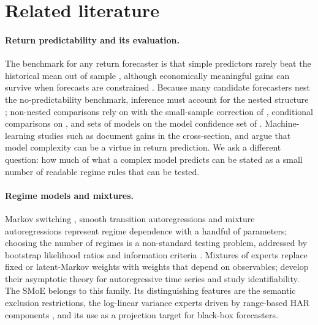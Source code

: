 \section{Related literature}\label{sec:literature}

\paragraph{Return predictability and its evaluation.}
The benchmark for any return forecaster is that simple predictors rarely beat the historical mean
out of sample \citep{welch2008comprehensive}, although economically meaningful gains can survive
when forecasts are constrained \citep{campbell2008predicting}. Because many candidate forecasters nest
the no-predictability benchmark, inference must account for the nested structure
\citep{clark2007approximately}; non-nested comparisons rely on \citet{diebold1995comparing} with the
small-sample correction of \citet{harvey1997testing}, conditional comparisons on
\citet{giacomini2006tests}, and sets of models on the model confidence set of
\citet{hansen2011model}. Machine-learning studies such as \citet{gu2020empirical} document gains in the
cross-section, and \citet{kelly2024virtue} argue that model complexity can be a virtue in return
prediction. We ask a different question: how much of what a complex model predicts can be stated
as a small number of readable regime rules that can be tested.

\paragraph{Regime models and mixtures.}
Markov switching \citep{hamilton1989new}, smooth transition autoregressions
\citep{terasvirta1994specification} and mixture autoregressions \citep{wong2000mixture,wong2001mixture}
represent regime dependence with a handful of parameters; choosing the number of regimes is a
non-standard testing problem, addressed by bootstrap likelihood ratios \citep{mclachlan1987bootstrapping}
and information criteria \citep{keribin2000consistent}. Mixtures of experts
\citep{jacobs1991adaptive,jordan1994hierarchical} replace fixed or latent-Markov weights with weights
that depend on observables; \citet{carvalho2005mixtures} develop their asymptotic theory for
autoregressive time series and \citet{jiang1999identifiability} study identifiability. The SMoE belongs
to this family. Its distinguishing features are the semantic exclusion restrictions, the log-linear
variance experts driven by range-based HAR components \citep{parkinson1980extreme,corsi2009simple},
and its use as a projection target for black-box forecasters.

